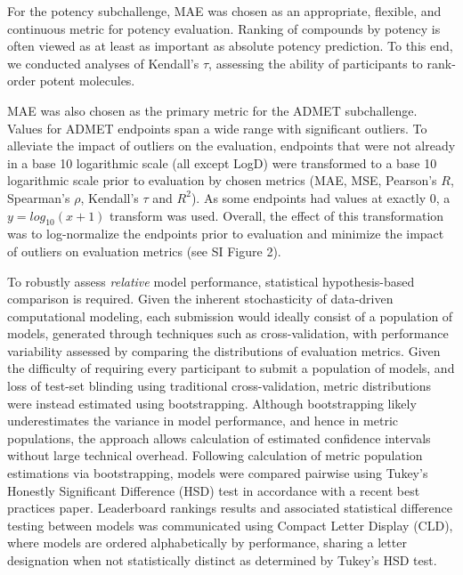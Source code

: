 \documentclass[journal=jcim,manuscript=article]{achemso}
\begin{document}
For the potency subchallenge, MAE was chosen as an appropriate, flexible, and continuous metric for potency evaluation. Ranking of compounds by potency is often viewed as at least as important as absolute potency prediction\cite{parks_gaieb_chiu_yang_shao_walters_jansen_mcgaughey_lewis_bembenek_et}. To this end, we conducted analyses of Kendall's $\tau$, assessing the ability of participants to rank-order potent molecules. 

MAE was also chosen as the primary metric for the ADMET subchallenge. Values for ADMET endpoints span a wide range with significant outliers. To alleviate the impact of outliers on the evaluation, endpoints that were not already in a base 10 logarithmic scale (all except LogD) were transformed to a base 10 logarithmic scale prior to evaluation by chosen metrics (MAE, MSE, Pearson's $R$, Spearman's $\rho$, Kendall's $\tau$ and $R^2$). As some endpoints had values at exactly 0, a $ y=log_{10}(x + 1)$ transform was used. Overall, the effect of this transformation was to log-normalize the endpoints prior to evaluation and minimize the impact of outliers on evaluation metrics (see SI Figure 2).

To robustly assess \textit{relative} model performance, statistical hypothesis-based comparison is required\cite{ash_practically_2024}. Given the inherent stochasticity of data-driven computational modeling, each submission would ideally consist of a population of models, generated through techniques such as cross-validation, with performance variability assessed by comparing the distributions of evaluation metrics. Given the difficulty of requiring every participant to submit a population of models, and loss of test-set blinding using traditional cross-validation, metric distributions were instead estimated using bootstrapping\cite{efron_bootstrap_1979}. Although bootstrapping likely underestimates the variance in model performance, and hence in metric populations, the approach allows calculation of estimated confidence intervals without large technical overhead. Following calculation of metric population estimations via bootstrapping, models were compared pairwise using Tukey's Honestly Significant Difference (HSD) test in accordance with a recent best practices paper\cite{ash_practically_2024}. Leaderboard rankings results and associated statistical difference testing between models was communicated using Compact Letter Display (CLD)\cite{cld_algorithm_2004}, where models are ordered alphabetically by performance, sharing a letter designation when not statistically distinct as determined by Tukey's HSD test. 
\end{document}
